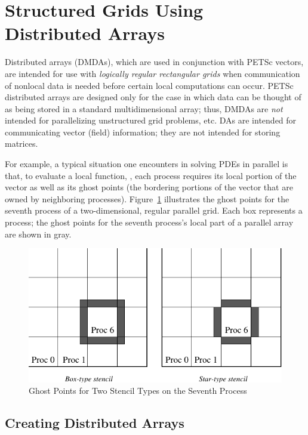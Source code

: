 \section{Structured Grids Using Distributed Arrays}
\label{sec_da} \label{sec_struct}

  Distributed arrays (DMDAs), which are used in
conjunction with PETSc vectors, are intended for use with {\em
logically regular rectangular grids} when communication of nonlocal data is
needed before certain local computations can occur.  PETSc distributed
arrays are designed only for the case in which data can be thought of
as being stored in a standard multidimensional array; thus, DMDAs 
are {\em not} intended for parallelizing unstructured grid problems, etc.
DAs are intended for communicating vector (field) information; they 
are not intended for storing matrices. 

For example, a typical situation one encounters in solving 
PDEs in parallel is that, to evaluate a local function, , each process
requires its local portion of the vector  as well as its ghost
points  (the bordering portions of the vector
that are owned by neighboring processes).  Figure~\ref{fig_ghosts}
illustrates the ghost points for the seventh process of a
two-dimensional, regular parallel grid.  Each box represents a
process; the ghost points for the seventh process's local part of
a parallel array are shown in gray.

\begin{figure}[tb]
\centerline{ \includegraphics{ghost}}
\caption{Ghost Points for Two Stencil Types on the Seventh Process}
\label{fig_ghosts}
\end{figure}

\subsection{Creating Distributed Arrays}


